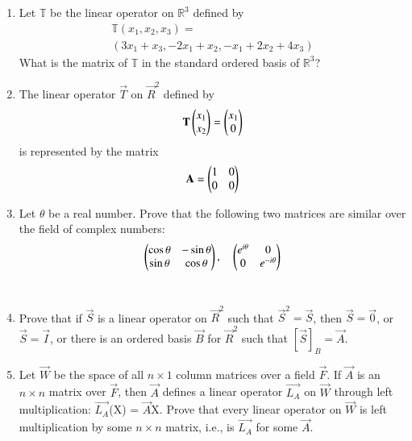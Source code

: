 \begin{enumerate}[label=\thesubsection.\arabic*.,ref=\thesubsection.\theenumi]
\begin{enumerate}
%
\\
\solution

\end{enumerate}
\item Let $\mathbb{T}$ be the linear operator on $\mathbb{R}^3$ defined by 
\begin{align}
    \mathbb{T}(x_1,x_2,x_3)=\\(3x_1+x_3,-2x_1+x_2,-x_1+2x_2+4x_3)\label{eq:solutions/3/4/7/a/1}
\end{align}
What is the matrix of $\mathbb{T}$ in the standard ordered basis of $\mathbb{R}^3$?
%
\\
\solution

\item The linear operator $\vec{T}$ on $\vec{R}^2$ defined by 
\begin{align}
	\mathbf{T}\begin{pmatrix}x_1\\x_2\end{pmatrix}=\begin{pmatrix}x_1\\0\end{pmatrix}
\end{align}
is represented by the matrix
\begin{align}
	\mathbf{A}=\begin{pmatrix}1&0\\
		       0&0\end{pmatrix}
\end{align}
\item Let $\theta$ be a real number. Prove that the following two matrices are similar over the field of complex numbers: 
\begin{align}
    \begin{pmatrix}\cos{\theta} & -\sin{\theta} \\ \sin{\theta} & \cos{\theta}\end{pmatrix},
    \quad
    \begin{pmatrix}e^{i\theta} & 0 \\ 0 & e^{-i\theta}\end{pmatrix} \nonumber
\end{align}
%
\\
\solution

\item Prove that if $\vec{S}$ is a linear operator on $\vec{R}^2$ such that $\vec{S}^2=\vec{S}$, 
then $\vec{S}=\vec{0}$, or $\vec{S}=\vec{I}$, or there is an ordered basis $\vec{B}$ for $\vec{R}^2$ 
such that $[\vec{S}]_B=\vec{A}$.
%
\\
\solution

%
\item Let $\vec{W}$ be the space of all $n \times 1$ column matrices over a field $\vec{F}$. If $\vec{A}$ is an $n \times n$ matrix over $\vec{F}$, then $\vec{A}$ defines a linear operator $\vec{L_{A}}$ on $\vec{W}$ through left multiplication: $\vec{L_{A}}$(X) = $\vec{A}$X. Prove that every linear operator on $\vec{W}$ is left multiplication by some $n\times n$ matrix, i.e., is $\vec{L_{A}}$ for some $\vec{A}$.


\end{enumerate}
